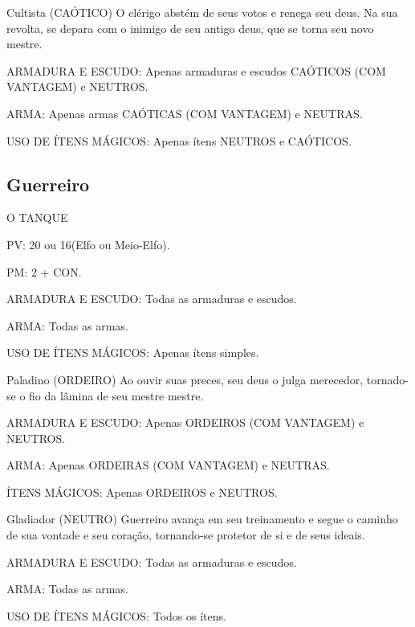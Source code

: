 \documentclass[10pt,twoside,twocolumn]{book}
\begin{document}
\begin{rpg-warnbox}{Cultista (CAÓTICO)}
	O clérigo abstém de seus votos e renega seu deus. Na sua revolta, se depara com o inimigo de seu antigo deus, que se torna seu novo mestre.
    \begin{rpg-list}
      	\item ARMADURA E ESCUDO: Apenas armaduras e escudos CAÓTICOS (COM VANTAGEM) e NEUTROS.
    	\item ARMA: Apenas armas CAÓTICAS (COM VANTAGEM) e NEUTRAS.
    	\item USO DE ÍTENS MÁGICOS: Apenas ítens NEUTROS e CAÓTICOS.
    \end{rpg-list}
\end{rpg-warnbox}

\subsection{Guerreiro}
	\begin{rpg-quotebox}{O TANQUE}
      \begin{rpg-list}
             \item PV: 20 ou 16(Elfo ou Meio-Elfo).
             \item PM: 2 + CON.
           \item ARMADURA E ESCUDO: Todas as armaduras e escudos.      
           \item ARMA: Todas as armas.
           \item USO DE ÍTENS MÁGICOS: Apenas ítens simples.
       \end{rpg-list}
	\end{rpg-quotebox}

\begin{rpg-suggestionbox}{Paladino (ORDEIRO)}
Ao ouvir suas preces, seu deus o julga merecedor, tornado-se o fio da lâmina de seu mestre mestre.
  \begin{rpg-list}
       \item ARMADURA E ESCUDO: Apenas ORDEIROS (COM VANTAGEM) e NEUTROS.
       \item ARMA: Apenas ORDEIRAS (COM VANTAGEM) e NEUTRAS.
       \item ÍTENS MÁGICOS: Apenas ORDEIROS e NEUTROS.
  \end{rpg-list}    
\end{rpg-suggestionbox}

\begin{rpg-commentbox}{Gladiador (NEUTRO)}
Guerreiro avança em seu treinamento e segue o caminho de sua vontade e seu coração, tornando-se protetor de si e de seus ideais.
    \begin{rpg-list}
      	\item ARMADURA E ESCUDO: Todas as armaduras e escudos.
    	\item ARMA: Todas as armas.
    	\item USO DE ÍTENS MÁGICOS: Todos os ítens.
    \end{rpg-list}
\end{rpg-commentbox}
\end{document}
